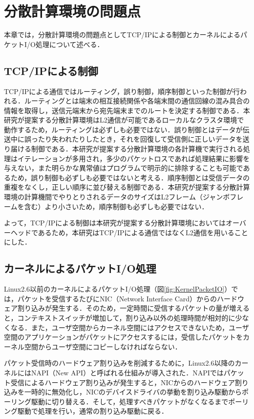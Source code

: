 \section{分散計算環境の問題点}
\label{sec:Problem}
本章では，分散計算環境の問題点としてTCP/IPによる制御とカーネルによるパケットI/O処理について述べる．

\subsection{TCP/IPによる制御}
TCP/IPによる通信ではルーティング，誤り制御，順序制御といった制御が行われる．ルーティングとは端末の相互接続関係や各端末間の通信回線の混み具合の情報を取得し，送信元端末から宛先端末までのルートを決定する制御である．本研究が提案する分散計算環境はL2通信が可能であるローカルなクラスタ環境で動作するため，ルーティングは必ずしも必要ではない．誤り制御とはデータが伝送中に誤ったり失われたりしたとき，それを回復して受信側に正しいデータを送り届ける制御である．本研究が提案する分散計算環境の各計算機で実行される処理はイテレーションが多用され，多少のパケットロスであれば処理結果に影響を与えない，また明らかな異常値はプログラムで明示的に排除することも可能であるため，誤り制御も必ずしも必要ではないと考える．順序制御とは受信データの重複をなくし，正しい順序に並び替える制御である．本研究が提案する分散計算環境の計算機間でやりとりされるデータのサイズはL2フレーム（ジャンボフレームを含む）より小さいため，順序制御も必ずしも必要ではない．

よって，TCP/IPによる制御は本研究が提案する分散計算環境においてはオーバーヘッドであるため，本研究はTCP/IPによる通信ではなくL2通信を用いることにした．

\subsection{カーネルによるパケットI/O処理}
Linux2.6以前のカーネルによるパケットI/O処理（図\ref{fig:KernelPacketIO}）では，パケットを受信するたびにNIC（Network Interface Card）からのハードウェア割り込みが発生する．そのため，一定時間に受信するパケットの量が増えると，コンテキストスイッチが増加して，割り込み以外の処理時間が相対的に少なくなる．また，ユーザ空間からカーネル空間にはアクセスできないため，ユーザ空間のアプリケーションがパケットにアクセスするには，受信したパケットをカーネル空間からユーザ空間にコピーしなければならない．

パケット受信時のハードウェア割り込みを削減するために，Linux2.6以降のカーネルにはNAPI（New API）と呼ばれる仕組みが導入された．NAPIではパケット受信によるハードウェア割り込みが発生すると，NICからのハードウェア割り込みを一時的に無効化し，NICのデバイスドライバの挙動を割り込み駆動からポーリング駆動に切り替える．そして，処理すべきパケットがなくなるまでポーリング駆動で処理を行い，通常の割り込み駆動に戻る．

